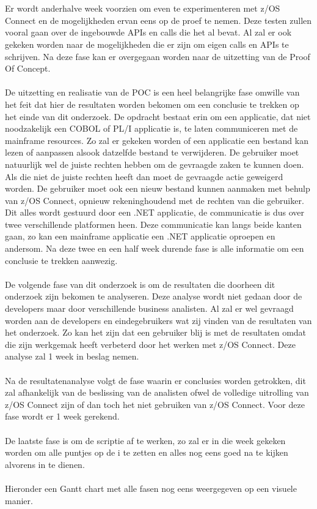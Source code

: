 \\ \\
Er wordt anderhalve week voorzien om even te experimenteren met z/OS Connect en de mogelijkheden ervan eens op de proef te nemen. Deze testen zullen vooral gaan over de ingebouwde APIs en calls die het al bevat. Al zal er ook gekeken worden naar de mogelijkheden die er zijn om eigen calls en APIs te schrijven. Na deze fase kan er overgegaan worden naar de uitzetting van de Proof Of Concept.
\\ \\
De uitzetting en realisatie van de POC is een heel belangrijke fase omwille van het feit dat hier de resultaten worden bekomen om een conclusie te trekken op het einde van dit onderzoek. De opdracht bestaat erin om een applicatie, dat niet noodzakelijk een COBOL of PL/I applicatie is, te laten communiceren met de mainframe resources. Zo zal er gekeken worden of een applicatie een bestand kan lezen of aanpassen alsook datzelfde bestand te verwijderen. De gebruiker moet natuurlijk wel de juiste rechten hebben om de gevraagde zaken te kunnen doen. Als die niet de juiste rechten heeft dan moet de gevraagde actie geweigerd worden. De gebruiker moet ook een nieuw bestand kunnen aanmaken met behulp van z/OS Connect, opnieuw rekeninghoudend met de rechten van die gebruiker. Dit alles wordt gestuurd door een .NET applicatie, de communicatie is dus over twee verschillende platformen heen. Deze communicatie kan langs beide kanten gaan, zo kan een mainframe applicatie een .NET applicatie oproepen en andersom. Na deze twee en een half week durende fase is alle informatie om een conclusie te trekken aanwezig.
\\ \\
De volgende fase van dit onderzoek is om de resultaten die doorheen dit onderzoek zijn bekomen te analyseren. Deze analyse wordt niet gedaan door de developers maar door verschillende business analisten. Al zal er wel gevraagd worden aan de developers en eindegebruikers wat zij vinden van de resultaten van het onderzoek. Zo kan het zijn dat een gebruiker blij is met de resultaten omdat die zijn werkgemak heeft verbeterd door het werken met z/OS Connect. Deze analyse zal 1 week in beslag nemen.
\\ \\
Na de resultatenanalyse volgt de fase waarin er conclusies worden getrokken, dit zal afhankelijk van de beslissing van de analisten ofwel de volledige uitrolling van z/OS Connect zijn of dan toch het niet gebruiken van z/OS Connect. Voor deze fase wordt er 1 week gerekend.
\\ \\
De laatste fase is om de scriptie af te werken, zo zal er in die week gekeken worden om alle puntjes op de i te zetten en alles nog eens goed na te kijken alvorens in te dienen.
\\ \\
Hieronder een Gantt chart met alle fasen nog eens weergegeven op een visuele manier.

